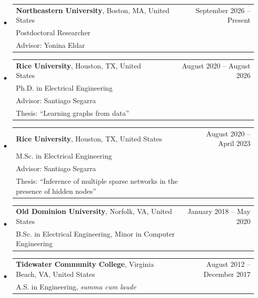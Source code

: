 \documentclass[letterpaper,10pt]{article}
\makeatletter
\newcommand{\resumeSubheading}[4]{
\vspace{-1pt}\item
  \begin{tabular*}{0.97\textwidth}[t]{l@{\extracolsep{\fill}}r}
    #1 & #2 \\
    #3 & #4 \\
  \end{tabular*}\vspace{-7pt}
}
\newcommand{\resumeSubHeadingList}{\begin{itemize}[leftmargin=0.05in, label={}]}
\newcommand{\resumeSubHeadingListEnd}{\end{itemize}}
\makeatother
\begin{document}
\resumeSubHeadingList
  \resumeSubheading
      {\textbf{Northeastern University}, Boston, MA, United States}
      {September 2026 -- Present \!\!\!\!\!}
      {Postdoctoral Researcher \\ 
      Advisor: Yonina Eldar 
      }
      {}
      \vspace{.15cm}
  \resumeSubheading
      {\textbf{Rice University}, Houston, TX, United States}
      {August 2020 -- August 2026 \!\!\!\!\!}
      {Ph.D. in Electrical Engineering \\ 
      Advisor: Santiago Segarra \\
      Thesis: ``Learning graphs from data'' }
      {}
      \vspace{.15cm}
  \resumeSubheading
      {\textbf{Rice University}, Houston, TX, United States}
      {August 2020 -- April 2023 \!\!\!\!\!}
      {M.Sc. in Electrical Engineering \\ 
      Advisor: Santiago Segarra \\
      Thesis: ``Inference of multiple sparse networks in the presence of hidden nodes'' }
      {}
      \vspace{.15cm}
  \resumeSubheading
      {\textbf{Old Dominion University}, Norfolk, VA, United States}
      {January 2018 -- May 2020 \!\!\!\!\!}
      {B.Sc. in Electrical Engineering,
      Minor in Computer Engineering }
      {}
      \vspace{.15cm}
  \resumeSubheading
      {\textbf{Tidewater Community College}, Virginia Beach, VA, United States}
      {August 2012 -- December 2017 \!\!\!\!\!}
      {A.S. in Engineering,
      \textit{summa cum laude}}
      {}
\resumeSubHeadingListEnd
\end{document}
